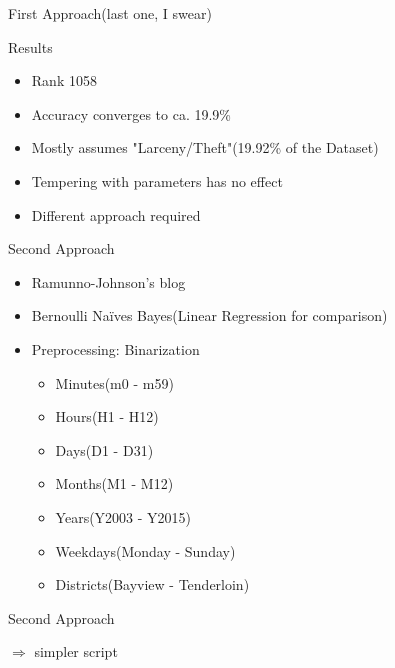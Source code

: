 \documentclass[11pt]{beamer}
\begin{document}
\begin{frame}{First Approach(last one, I swear)}

\end{frame}

\begin{frame}[fragile]{Results}
\begin{itemize}
\item Rank 1058
\item Accuracy converges to ca. 19.9\%
\item Mostly assumes "Larceny/Theft"(19.92\% of the Dataset)
\item Tempering with parameters has no effect
\item Different approach required
\end{itemize}
\end{frame}

\begin{frame}{Second Approach}
\begin{itemize}
\item Ramunno-Johnson's blog
\item Bernoulli Naïves Bayes(Linear Regression for comparison)
\item Preprocessing: Binarization
\begin{itemize}
\item Minutes(m0 - m59)
\item Hours(H1 - H12)
\item Days(D1 - D31)
\item Months(M1 - M12)
\item Years(Y2003 - Y2015)
\item Weekdays(Monday - Sunday)
\item Districts(Bayview - Tenderloin)
\end{itemize}
\end{itemize}
\end{frame}

\begin{frame}{Second Approach}

$\Rightarrow$ simpler script
\end{frame}
\end{document}
